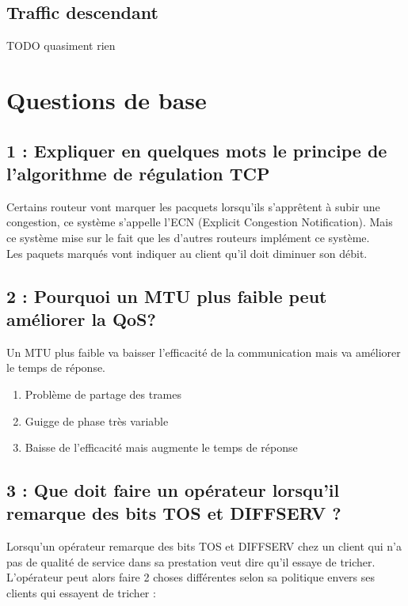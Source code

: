 \documentclass{article}
\begin{document}
\subsection{Traffic descendant}
TODO quasiment rien

\section{Questions de base}

\subsection*{1 : Expliquer en quelques mots le principe de l'algorithme de régulation TCP}

Certains routeur vont marquer les pacquets lorsqu'ils s'apprêtent à subir une congestion, ce système s'appelle l'ECN (Explicit Congestion Notification). Mais ce système mise sur le fait que les d'autres routeurs implément ce système. \cite{cours}\\

Les paquets marqués vont indiquer au client qu'il doit diminuer son débit.

\subsection*{2 : Pourquoi un MTU plus faible peut améliorer la QoS?}

Un MTU plus faible va baisser l'efficacité de la communication mais va améliorer le temps de réponse.
\begin{enumerate}
\item Problème de partage des trames
\item Guigge de phase très variable
\item Baisse de l'efficacité mais augmente le temps de réponse
\end{enumerate}

\subsection*{3 : Que doit faire un opérateur lorsqu'il remarque des bits TOS et DIFFSERV ?}

Lorsqu'un opérateur remarque des bits TOS \cite{ToS} et DIFFSERV \cite{DiffServ} chez un client qui n'a pas de qualité de service dans sa prestation veut dire qu'il essaye de tricher.\\

L'opérateur peut alors faire 2 choses différentes selon sa politique envers ses clients qui essayent de tricher : 
\end{document}
